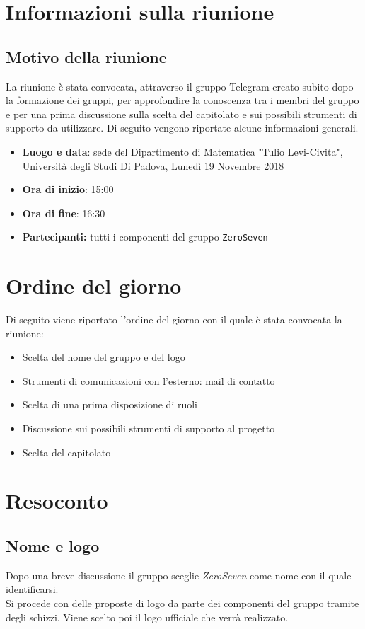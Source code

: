 \documentclass[a4paper,12pt]{article}
\begin{document}
	\cleardoublepage
	\pagestyle{mymain}
	
	\tableofcontents
	\cleardoublepage
	
	\section{Informazioni sulla riunione}
	\subsection{Motivo della riunione}
	La riunione è stata convocata, attraverso il gruppo Telegram creato subito dopo la formazione dei gruppi, per approfondire la conoscenza tra i membri del gruppo e per una prima discussione sulla scelta del capitolato e  sui possibili strumenti di supporto da utilizzare. 
	Di seguito vengono riportate alcune informazioni generali.
	\begin{itemize}
		\item \textbf{Luogo e data}: sede del Dipartimento di Matematica "Tulio Levi-Civita", Università degli Studi Di Padova, Lunedì 19 Novembre 2018
		\item \textbf{Ora di inizio}: 15:00
		\item \textbf{Ora di fine}: 16:30
		\item \textbf{Partecipanti: } tutti i componenti del gruppo \texttt{ZeroSeven} 
	\end{itemize}
	\section{Ordine del giorno}
	Di seguito viene riportato l'ordine del giorno con il quale è stata convocata la riunione:
	\begin{itemize}
		\item Scelta del nome del gruppo e del logo
		\item Strumenti di comunicazioni con l'esterno: mail di contatto
		\item Scelta di una prima disposizione di ruoli
		\item Discussione sui possibili strumenti di supporto al progetto
		\item Scelta del capitolato
	\end{itemize}
	\section{Resoconto}
	\subsection{Nome e logo}
	Dopo una breve discussione il gruppo sceglie \textit{ZeroSeven} come nome con il quale identificarsi.\\
	Si procede con delle proposte di logo da parte dei componenti del gruppo tramite degli schizzi. Viene scelto poi il logo ufficiale che verrà realizzato.
\end{document}
